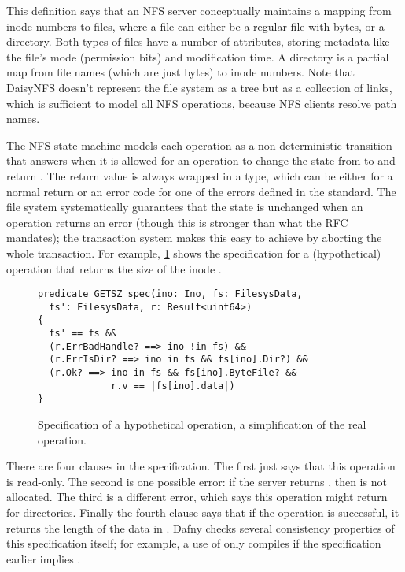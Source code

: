 This definition says that an NFS server conceptually maintains a mapping from
inode numbers to files, where a file can either be a regular file with
bytes, or a directory. Both types of files have a number of attributes, storing
metadata like the file's mode (permission bits) and modification time. A
directory is a partial map from file names
(which are just bytes) to inode numbers. Note that DaisyNFS doesn't
represent the file system as a tree but as a collection of
links, which is sufficient to model all NFS operations, because
NFS clients resolve path names.


The NFS state machine models each operation as a non-deterministic transition
that answers when it is allowed for an operation to change the state from
 to  and return . The return value is always wrapped in a
 type, which can be either  for a normal return or an error
code for one of the errors defined in the standard. The file system systematically guarantees
that the state is unchanged when an operation returns an error (though this is
stronger than what the RFC mandates); the transaction system makes this easy to
achieve by aborting the whole transaction. For example,
\cref{fig:getsz} shows the
specification for a (hypothetical)  operation that returns the size of
the inode .

\begin{figure}
\small
\begin{verbatim}
predicate GETSZ_spec(ino: Ino, fs: FilesysData,
  fs': FilesysData, r: Result<uint64>)
{
  fs' == fs &&
  (r.ErrBadHandle? ==> ino !in fs) &&
  (r.ErrIsDir? ==> ino in fs && fs[ino].Dir?) &&
  (r.Ok? ==> ino in fs && fs[ino].ByteFile? &&
             r.v == |fs[ino].data|)
}
\end{verbatim}
\caption{Specification of a hypothetical  operation, a simplification
  of the real  operation.}
\label{fig:getsz}
\end{figure}

There are four clauses in the specification. The first just says that this
operation is read-only. The second is one possible error: if the server returns
, then  is not allocated. The third is a different
error, which says this operation might return  for directories.
Finally the fourth clause says that if the operation is successful, it returns the
length of the data in . Dafny checks several consistency properties
of this specification itself; for example, a use of  only compiles
if the specification earlier implies .

